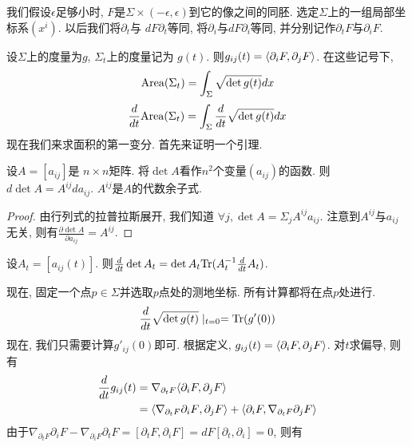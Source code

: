 \begin{remark}
    我们假设$\epsilon$足够小时, $F$是$\Sigma \times (-\epsilon,\epsilon)$到它的像之间的同胚. 选定$\Sigma$上的一组局部坐标系$(x^i)$. 以后我们将$\partial_t$与 $dF\partial_t$等同, 将$\partial_i$与$dF\partial_i$等同, 并分别记作$\partial_t F$与$\partial_i F$.
\end{remark}
设$\Sigma$上的度量为$g$, $\Sigma_t$上的度量记为 $g(t)$. 则$g_{ij}(t)={\left < \partial_iF, \partial_jF \right >}$. 在这些记号下, 
\begin{equation}
    \text{Area}(\Sigma_t)=\int_\Sigma \sqrt{\det g(t)}dx
\end{equation}
\begin{equation}
    \frac{d}{dt} \text{Area}(\Sigma_t)=\int_\Sigma \frac{d}{dt} \sqrt{\det g(t)}dx
\end{equation}
现在我们来求面积的第一变分. 首先来证明一个引理.
\begin{lemma}
    设$A=[a_{ij}]$是 $n \times n$矩阵. 将$\det A$看作$n^2$个变量$(a_{ij})$的函数. 则$d\det A= A^{ij}da_{ij}$. $A^{ij}$是$A$的代数余子式.
\end{lemma}
\begin{proof}
    由行列式的拉普拉斯展开, 我们知道 $\forall j, \det A= \Sigma_{j}A^{ij}a_{ij}$. 注意到$A^{ij}$与${a_{ij}}$无关, 则有$\frac{\partial \det A}{\partial a_{ij}}=A^{ij}$.
\end{proof}
\begin{corollary} \label{det_jacobi}
    设$A_t=[a_{ij}(t)]$. 则$\frac{d}{dt} \det A_t=\det A_t \text{Tr}(A_t^{-1}\frac{d}{dt} A_t)$.
\end{corollary}
现在, 固定一个点$p \in \Sigma$并选取$p$点处的测地坐标. 所有计算都将在点$p$处进行.
\begin{equation}
    \frac{d}{dt} \sqrt{\det g(t)}\mid_{t=0}=\text{Tr}(g'(0))
\end{equation}
现在, 我们只需要计算$g'_{ij}(0)$即可. 根据定义, $g_{ij}(t)={\left < \partial_iF, \partial_jF \right >}$. 对$t$求偏导, 则有
\begin{equation}
    \begin{split}
        \frac{d}{dt} g_{ij}(t)& =\nabla_{\partial_t F}{\left < \partial_iF, \partial_jF \right >} \\
                    & ={\left < \nabla_{\partial_t F}{\partial_iF}, \partial_jF \right >}+ {\left < \partial_iF, \nabla_{\partial_tF}\partial_jF \right >}
    \end{split}
\end{equation}
由于$\nabla_{\partial_tF}\partial_iF - \nabla_{\partial_iF} \partial_tF=[\partial_tF,\partial_iF]=dF[\partial_t,\partial_i]=0$, 则有

